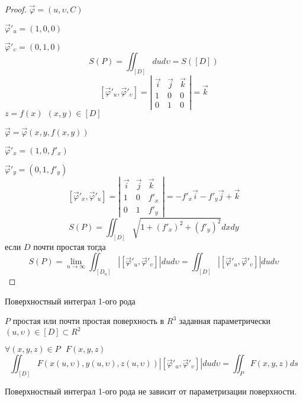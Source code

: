 \begin{proof}
  $\vec \varphi = (u, \upsilon, C)$

  $\vec \varphi'_u = (1,0,0)$

  $\vec \varphi'_{\upsilon} = (0,1,0)$
  $$
  S(P) = \iint_{[D]} dud\upsilon = S([D])
  $$
  $$
  [\vec \varphi'_u, \vec \varphi'_{\upsilon}] =
  \left|
  \begin{array}{ccc}
    \vec i & \vec j & \vec k \\
    1 & 0 & 0 \\
    0 & 1 & 0
  \end{array}
  \right| = \vec k
  $$
  $z = f(x) ~~ (x, y) \in [D]$

  $\vec \varphi = \vec \varphi(x, y, f(x,y))$

  $\vec \varphi'_x = (1, 0, f'_x)$

  $\vec \varphi'_y = (0, 1, f'_y)$
  $$
  [\vec \varphi'_x, \vec \varphi'_u] =
  \left|
  \begin{array}{ccc}
    \vec i & \vec j & \vec k \\
    1 & 0 & f'_x \\
    0 & 1 & f'_y
  \end{array}
  \right| = -f'_x \vec i - f'_y \vec j + \vec k
  $$
  $$
  S(P) = \iint_{[D]} \sqrt{1 + (f'_x)^2 + (f'_y)^2} dxdy
  $$
  если $D$ почти простая тогда
  $$
  S(P) = \lim_{n \to \infty} \iint_{[D_n]} |[\vec \varphi'_u,
  \vec \varphi'_{\upsilon}]| du d\upsilon = \iint_{[D]} |[\vec \varphi'_u,
  \vec \varphi'_{\upsilon}]| du d\upsilon
  $$
\end{proof}

\begin{title}[\Large]
  Поверхностный интеграл 1-ого рода
\end{title}

\begin{define}
  $P$ простая или почти простая поверхность в $R^3$ заданная параметрически
  $(u, \upsilon) \in [D] \subset R^2$

  $\forall (x,y,z) \in P ~~~ F(x,y,z)$
  $$
  \iint_{[D]} F(x(u, \upsilon), y(u,\upsilon), z(u, \upsilon))
  |[\vec \varphi'_u, \vec \varphi'_{\upsilon}]| du d\upsilon =
  \iint_P F(x,y,z) ds
  $$
\end{define}

\begin{theorem}
  Поверхностный интеграл 1-ого рода не зависит от параметризации поверхности.
\end{theorem}

